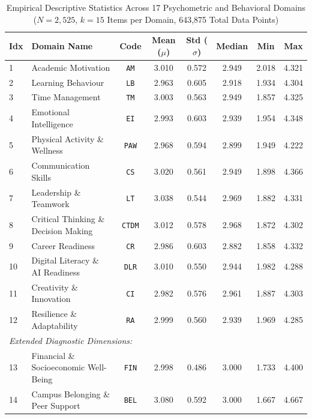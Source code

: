 \begin{table}[htbp]
\centering
\small
\caption{Empirical Descriptive Statistics Across 17 Psychometric and Behavioral Domains ($N = 2,525$, $k = 15$ Items per Domain, 643,875 Total Data Points)}
\label{tab:17_domains_descriptive_stats}
\begin{tabular}{llcccccc}
\toprule
\textbf{Idx} & \textbf{Domain Name} & \textbf{Code} & \textbf{Mean ($\mu$)} & \textbf{Std ($\sigma$)} & \textbf{Median} & \textbf{Min} & \textbf{Max} \\
\midrule
1  & Academic Motivation                     & \texttt{AM}   & 3.010 & 0.572 & 2.949 & 2.018 & 4.321 \\
2  & Learning Behaviour                     & \texttt{LB}   & 2.963 & 0.605 & 2.918 & 1.934 & 4.304 \\
3  & Time Management                        & \texttt{TM}   & 3.003 & 0.563 & 2.949 & 1.857 & 4.325 \\
4  & Emotional Intelligence                 & \texttt{EI}   & 2.993 & 0.603 & 2.939 & 1.954 & 4.348 \\
5  & Physical Activity \& Wellness          & \texttt{PAW}  & 2.968 & 0.594 & 2.899 & 1.949 & 4.222 \\
6  & Communication Skills                   & \texttt{CS}   & 3.020 & 0.561 & 2.949 & 1.898 & 4.366 \\
7  & Leadership \& Teamwork                 & \texttt{LT}   & 3.038 & 0.544 & 2.969 & 1.882 & 4.331 \\
8  & Critical Thinking \& Decision Making   & \texttt{CTDM} & 3.012 & 0.578 & 2.968 & 1.872 & 4.302 \\
9  & Career Readiness                       & \texttt{CR}   & 2.986 & 0.603 & 2.882 & 1.858 & 4.332 \\
10 & Digital Literacy \& AI Readiness       & \texttt{DLR}  & 3.010 & 0.550 & 2.944 & 1.982 & 4.288 \\
11 & Creativity \& Innovation               & \texttt{CI}   & 2.982 & 0.576 & 2.961 & 1.887 & 4.303 \\
12 & Resilience \& Adaptability             & \texttt{RA}   & 2.999 & 0.560 & 2.939 & 1.969 & 4.285 \\
\midrule
\multicolumn{8}{l}{\textit{Extended Diagnostic Dimensions:}} \\
13 & Financial \& Socioeconomic Well-Being  & \texttt{FIN}  & 2.998 & 0.486 & 3.000 & 1.733 & 4.400 \\
14 & Campus Belonging \& Peer Support       & \texttt{BEL}  & 3.080 & 0.592 & 3.000 & 1.667 & 4.667 \\

\end{tabular}
\end{table}
